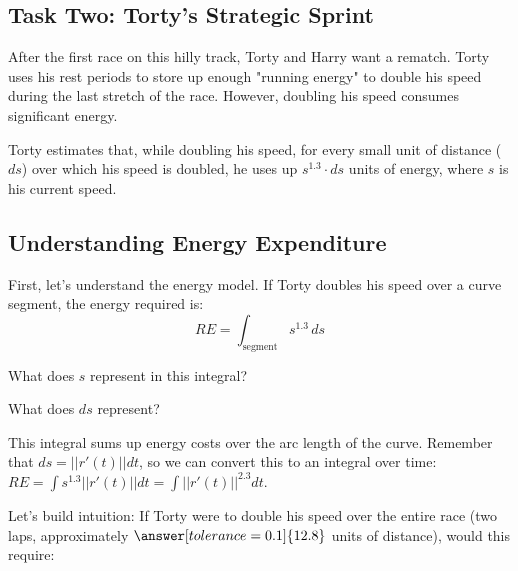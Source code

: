\documentclass{ximera}
\begin{document}
\begin{problem}
\begin{feedback}
\begin{problem}
\begin{problem}
\begin{feedback}
\section{Task Two: Torty's Strategic Sprint}

After the first race on this hilly track, Torty and Harry want a rematch. Torty uses his rest periods to store up enough "running energy" to double his speed during the last stretch of the race. However, doubling his speed consumes significant energy.

Torty estimates that, while doubling his speed, for every small unit of distance ($ds$) over which his speed is doubled, he uses up $s^{1.3}\cdot ds$ units of energy, where $s$ is his current speed.

\subsection*{Understanding Energy Expenditure}

\begin{problem}
    First, let's understand the energy model. If Torty doubles his speed over a curve segment, the energy required is:
    \[RE=\int_{\text{segment}} s^{1.3}\, ds\]
    
    What does $s$ represent in this integral?
    \begin{multipleChoice}
    \end{multipleChoice}
    
    What does $ds$ represent?
    \begin{multipleChoice}
    \end{multipleChoice}
    
    \begin{feedback}
        This integral sums up energy costs over the arc length of the curve. Remember that $ds=||r'(t)||dt$, so we can convert this to an integral over time: $RE=\int s^{1.3}||r'(t)||dt=\int ||r'(t)||^{2.3}dt$.
    \end{feedback}
\end{problem}

\begin{problem}
    Let's build intuition: If Torty were to double his speed over the entire race (two laps, approximately $\answer[tolerance=0.1]{12.8}$ units of distance), would this require:
    \begin{multipleChoice}
    \end{multipleChoice>
    

\end{multipleChoice}
\end{problem}
\end{feedback}
\end{problem}
\end{problem}
\end{feedback}
\end{problem}
\end{document}
